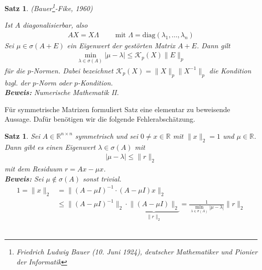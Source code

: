 \documentclass[%
a4paper,
11pt,		%
]
{scrartcl}
\theoremstyle{plain}
\theoremstyle{plain}
\newtheorem{mysatz}[mydef]{Satz}
\theoremstyle{plain}
\theoremstyle{plain}
\begin{document}
\begin{mysatz} (Bauer\footnote{Friedrich Ludwig Bauer (10. Juni 1924), deutscher Mathematiker und Pionier der Informatik}-Fike, 1960)

Ist $A$ diagonalisierbar, also
\begin{align*}
AX = X\Lambda \qquad \text{ mit } \Lambda = \text{diag}(\lambda_1,\dots,\lambda_n)
\end{align*}
Sei $\mu \in \sigma(A+E)$ ein Eigenwert der gestörten Matrix $A+E$. Dann gilt
\begin{align*}
\min\limits_{\lambda \in \sigma(A)} |\mu - \lambda| \leq \mathcal{K}_p(X) \|E\|_p
\end{align*}
für die $p$-Normen. Dabei bezeichnet $\mathcal{K}_p(X) = \|X\|_p \|X^{-1}\|_p$ die Kondition bzgl. der $p$-Norm oder $p$-Kondition.\\

\textbf{Beweis:} Numerische Mathematik II.
\end{mysatz}

Für symmetrische Matrizen formuliert Satz  eine elementar zu beweisende Aussage. Dafür benötigen wir die folgende Fehlerabschätzung.

\begin{mysatz}\label{satz:ewresiduum}
Sei $A \in \mathbb{R}^{n \times n}$ symmetrisch und sei $0 \neq x \in \mathbb{R}$ mit $\|x\|_2 = 1$ und $\mu \in \mathbb{R}$. Dann gibt es einen Eigenwert 
$\lambda \in \sigma(A)$ mit
\begin{align*}
|\mu - \lambda| \leq \|r\|_2
\end{align*}
mit dem Residuum $r = Ax - \mu x$.\\

\textbf{Beweis:} Sei $\mu \notin \sigma(A)$ sonst trivial.
\begin{align*}
1 = \|x\|_2 & = \|(A -\mu I)^{-1} \cdot  (A - \mu I)x \|_2 \\
& \leq \|(A - \mu I)^{-1}\|_2 \cdot  \underbrace{\|(A - \mu I)\|_2}_{\|r\|_2} = \frac{1}{\min\limits_{\lambda \in \sigma(A)} |\mu - \lambda|} \|r\|_2
\end{align*}
\
\end{mysatz}
\end{document}
